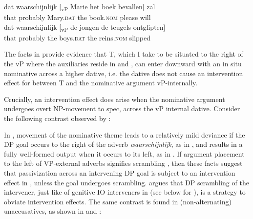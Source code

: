\documentclass[output=paper]{LSP/langsci}
\begin{document}
\ex \label{ex:anagnost:5b}
\gll
 dat  waarschijnlijk [\textsubscript{vP} Marie het boek bevallen] zal\\
  that  probably {} Mary.\textsc{dat} the book.\textsc{nom} please will\\

\ex \label{ex:anagnost:5c}
\gll  dat waarschijnlijk [\textsubscript{vP} de jongen de teugels ontglipten]\\
  that probably {} the boys.\textsc{dat} the  reins.\textsc{nom} slipped\\
\z
\z

The facts in  provide evidence that T, which I take to be situated to the right of the vP where the auxiliaries reside in  and , can enter downward  with an in situ nominative across a higher dative, i.e. the dative does not cause an intervention effect for  between T and the nominative argument vP-internally. 


Crucially, an intervention effect does arise when the nominative argument undergoes overt NP-movement to spec, across the vP internal dative.  Consider the following contrast observed by  \citet[207--208]{denDikken1995}:

\ea\label{ex:anagnost:6}
\z
\z

In , movement of the nominative theme leads to a relatively mild deviance if the DP goal occurs to the right of the adverb \textit{waarschijnlijk}, as in ,\textit{} and results in a fully well-formed output when it occurs to its left, as in . If argument placement to the left of VP-external adverbs
signifies scrambling%
, then these facts suggest that passivization across an intervening DP goal is subject to an intervention effect in , unless the goal undergoes scrambling. \citet{Anagnostopoulou2003} argues that DP scrambling of the intervener, just like  of genitive IO interveners in  (see  below for ), is a strategy to obviate intervention effects. The same contrast is found in (non-alternating) unaccusatives, as shown in  and : 
\end{document}
